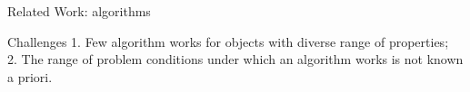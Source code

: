 \documentclass[10pt]{beamer}
\begin{document}
\begin{frame}{Related Work: algorithms}

\begin{alertblock}{Challenges}
1. Few algorithm works for objects with diverse range of properties;\\
2. The range of problem conditions under which an algorithm works is not known a priori.
\end{alertblock}

\end{frame}

\end{document}
